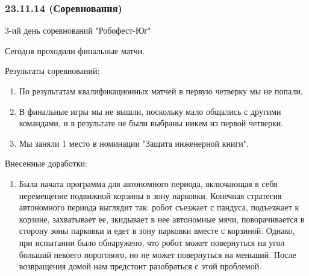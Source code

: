 \subsubsection{23.11.14 (Соревнования)}
\begin{center}
	3-ий день соревнований "Робофест-Юг"
\end{center}
Сегодня проходили финальные матчи.

Результаты соревнований:
\begin{enumerate}
	\item По результатам квалификационных матчей в первую четверку мы не попали.
	
	\item В финальные игры мы не вышли, поскольку мало общались с другими командами, и в результате не были выбраны никем из первой четверки.
	
	\item Мы заняли 1 место в номинации "Защита инженерной книги".
\end{enumerate}

Внесенные доработки:
\begin{enumerate}
	\item Была начата программа для автономного периода, включающая в себя перемещение подвижной корзины в зону парковки. Конечная стратегия автономного периода выглядит так: робот съезжает с пандуса, подъезжает к корзине, захватывает ее, зкидывает в нее автономные мячи, поворачивается в сторону зоны парковки и едет в зону парковки вместе с корзиной. Однако, при испытании было обнаружено, что робот может повернуться на угол больший некоего порогового, но не может повернуться на меньший. После возвращения домой нам предстоит разобраться с этой проблемой.
\end{enumerate}

